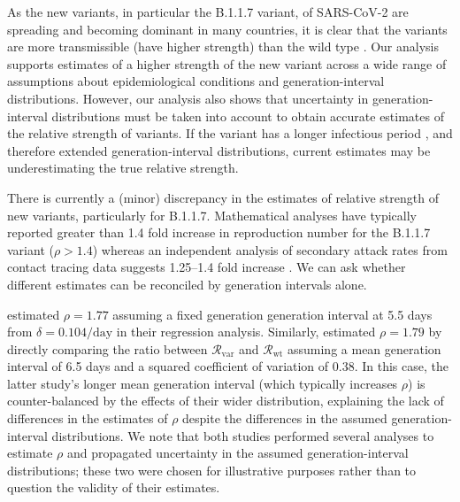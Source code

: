 \documentclass[12pt]{article}
\newcommand{\vvvar}{\mathrm{var}}
\newcommand{\wwwt}{\mathrm{wt}}
\newcommand{\Rx}[1]{\ensuremath{{\mathcal R}_{#1}}\xspace}
\newcommand{\Rw}{\Rx{\wwwt}}
\newcommand{\Rv}{\Rx{\vvvar}}
\newcommand{\pday}{\ensuremath{/\textrm{day}}}
\begin{document}
As the new variants, in particular the B.1.1.7 variant, of SARS-CoV-2 are spreading and becoming dominant in many countries, it is clear that the variants are more transmissible (have higher strength) than the wild type \citep{switzerland2021variant, davies2021estimated, di2021impact, leung2021early, volz2021transmission,zhao2021}.
Our analysis supports estimates of a higher strength of the new variant across a wide range of assumptions about epidemiological conditions and generation-interval distributions.
However, our analysis also shows that uncertainty in generation-interval distributions must be taken into account to obtain accurate estimates of the relative strength of variants.
If the variant has a longer infectious period \citep{kissler2021densely}, and therefore extended generation-interval distributions, current estimates may be underestimating the true relative strength.

There is currently a (minor) discrepancy in the estimates of relative strength of new variants, particularly for B.1.1.7.
Mathematical analyses have typically reported greater than 1.4 fold increase in reproduction number for the B.1.1.7 variant ($\rho > 1.4$) whereas an independent analysis of secondary attack rates from contact tracing data suggests 1.25--1.4 fold increase \citep{ukinvest}.
We can ask whether different estimates can be reconciled by generation intervals alone.

\cite{davies2021estimated} estimated $\rho=1.77$ assuming a fixed generation generation interval at 5.5 days from $\delta=0.104\pday$ in their regression analysis.
Similarly, \cite{volz2021transmission} estimated $\rho=1.79$ by directly comparing the ratio between $\Rv$ and $\Rw$ assuming a mean generation interval of 6.5 days and a squared coefficient of variation of 0.38.
In this case, the latter study's longer mean generation interval (which typically increases $\rho$) is counter-balanced by the effects of their wider distribution, explaining the lack of differences in the estimates of $\rho$ despite the differences in the assumed generation-interval distributions.
We note that both studies performed several analyses to estimate $\rho$ and propagated uncertainty in the assumed generation-interval distributions; these two were chosen for illustrative purposes rather than to question the validity of their estimates.
\end{document}
